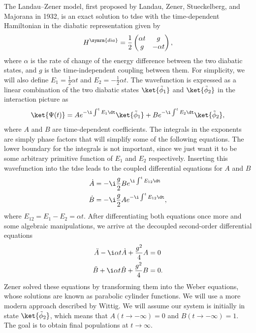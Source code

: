 The Landau--Zener model, first proposed by Landau, Zener, Stueckelberg, and Majorana in 1932,\supercite{10.1016/B978-0-08-010586-4.50014-6,10.1098/rspa.1932.0165,10.5169/seals-110177,10.1007/BF02960953} is an exact solution to \acrshort{tdse} with the time-dependent Hamiltonian in the diabatic representation given by
\begin{equation}\label{eq:landau_zener_hamiltonian}
H^{\symrm{dia}}=\frac{1}{2}\begin{pmatrix}
\alpha t&g\\
g&-\alpha t
\end{pmatrix},
\end{equation}
where $\alpha$ is the rate of change of the energy difference between the two diabatic states, and $g$ is the time-independent coupling between them. For simplicity, we will also define $E_1=\frac{1}{2}\alpha t$ and $E_2=-\frac{1}{2}\alpha t$. The wavefunction is expressed as a linear combination of the two diabatic states $\ket{\tilde{\phi}_1}$ and $\ket{\tilde{\phi}_2}$ in the interaction picture as
\begin{equation}
\ket{\Psi(t)}=Ae^{-\i\int^tE_1\dt}\ket{\tilde{\phi}_1}+Be^{-\i\int^tE_2\dt}\ket{\tilde{\phi}_2},
\end{equation}
where $A$ and $B$ are time-dependent coefficients. The integrals in the exponents are simply phase factors that will simplify some of the following equations. The lower boundary for the integrals is not important, since we just want it to be some arbitrary primitive function of $E_1$ and $E_2$ respectively. Inserting this wavefunction into the \acrshort{tdse} leads to the coupled differential equations for $A$ and $B$
\begin{align}
\dot A&=-\i\frac{g}{2}Be^{\i\int^tE_{12}\dt}\\
\dot B&=-\i\frac{g}{2}Ae^{-\i\int^tE_{12}\dt},
\end{align}
where $E_{12}=E_1-E_2=\alpha t$. After differentiating both equations once more and some algebraic manipulations, we arrive at the decoupled second-order differential equations
\begin{align}
\ddot A-\i\alpha t\dot A+\frac{g^2}{4}A&=0\\
\ddot B+\i\alpha t\dot B+\frac{g^2}{4}B&=0.\label{eq:landau_zener_uncoupled_b}
\end{align}
Zener solved these equations by transforming them into the Weber equations, whose solutions are known as parabolic cylinder functions.\supercite{10.1017/9781009004091} We will use a more modern approach described by Wittig.\supercite{10.1021/jp040627u} We will assume our system is initially in state $\ket{\tilde{\phi}_2}$, which means that $A(t\to-\infty)=0$ and $B(t\to-\infty)=1$. The goal is to obtain final populations at $t\to\infty$.


